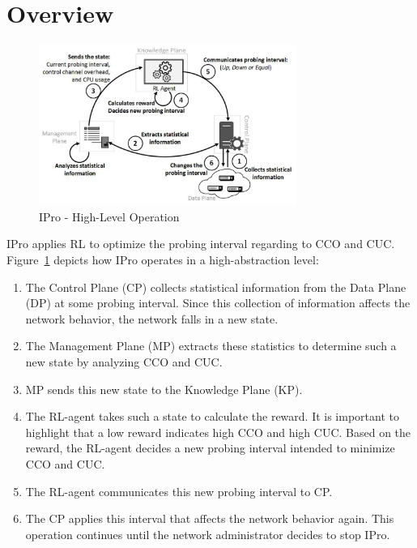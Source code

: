 \section{Overview}
\label{sec:Overview}
\begin{figure}[h!]
    \centering
    \includegraphics[width=0.75\textwidth]{figures/Figure2-IPro-high-level-operation}
    \caption{IPro - High-Level Operation}
    \label{fig:high_level_ipro}
\end{figure}

IPro applies RL to optimize the probing interval regarding to CCO and CUC. Figure~\ref{fig:high_level_ipro} depicts how IPro operates in a high-abstraction level:

\begin{enumerate}[label=\protect\circled{\arabic*}]
    \item The Control Plane (CP) collects statistical information from the Data Plane (DP) at some probing interval. Since this collection of information affects the network behavior, the network falls in a new state.
    \item The Management Plane (MP) extracts these statistics to determine such a new state by analyzing CCO and CUC.
    \item MP sends this new state to the Knowledge Plane (KP).
    \item The RL-agent takes such a state to calculate the reward. It is important to highlight that a low reward indicates high CCO and high CUC. Based on the reward, the RL-agent decides a new probing interval intended to minimize CCO and CUC.
    \item The RL-agent communicates this new probing interval to CP.
    \item The CP applies this interval that affects the network behavior again. This operation continues until the network administrator decides to stop IPro.
\end{enumerate}

